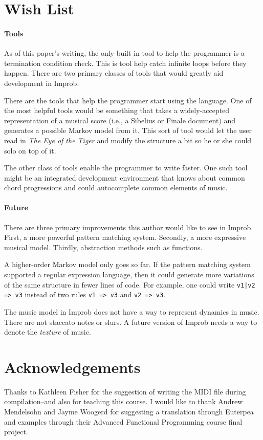 \documentclass{sigplanconf-pldi15}
\begin{document}
\section{Wish List}
\paragraph{Tools}
As of this paper's writing, the only built-in tool to help the programmer is a termination condition check. This is tool help catch infinite loops before they happen. There are two primary classes of tools that would greatly aid development in Improb.

There are the tools that help the programmer start using the language. One of the most helpful tools would be something that takes a widely-accepted representation of a musical score (i.e., a Sibelius or Finale document) and generates a possible Markov model from it. This sort of tool would let the user read in \textit{The Eye of the Tiger} and modify the structure a bit so he or she could solo on top of it.

The other class of tools enable the programmer to write faster. One such tool might be an integrated development environment that knows about common chord progressions and could autocomplete common elements of music.

\paragraph{Future}
There are three primary improvements this author would like to see in Improb. First, a more powerful pattern matching system. Secondly, a more expressive musical model. Thirdly, abstraction methods such as functions.

A higher-order Markov model only goes so far. If the pattern matching system supported a regular expression language, then it could generate more variations of the same structure in fewer lines of code. For example, one could write \texttt{v1|v2 => v3} instead of two rules \texttt{v1 => v3} and \texttt{v2 => v3}.

The music model in Improb does not have a way to represent dynamics in music. There are not staccato notes or slurs. A future version of Improb needs a way to denote the \textit{texture} of music.


\section{Acknowledgements}
Thanks to Kathleen Fisher for the suggestion of writing the MIDI file during compilation--and also for teaching this course.
I would like to thank Andrew Mendelsohn and Jayme Woogerd for suggesting a translation through Euterpea and examples through their Advanced Functional Programming course final project.
\end{document}

